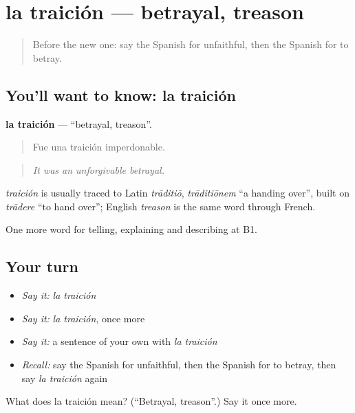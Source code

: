 \section[la traición]{la traición — betrayal, treason}

\label{lesson:ES-C745-traicion}



\begin{quote}
Before the new one: say the Spanish for unfaithful, then the Spanish for to betray.
\end{quote}

\subsection*{You'll want to know: la traición}
\textbf{la traición} — \textquotedblleft{}betrayal, treason\textquotedblright{}.

\begin{quote}
Fue una traición imperdonable.
\end{quote}

\begin{quote}
\emph{It was an unforgivable betrayal.}
\end{quote}

\begin{cousinweb}
\emph{traición} is usually traced to Latin \emph{trāditiō}, \emph{trāditiōnem} \textquotedblleft{}a handing over\textquotedblright{}, built on \emph{trādere} \textquotedblleft{}to hand over\textquotedblright{}; English \emph{treason} is the same word through French.
\end{cousinweb}

\begin{grammarlens}[title={What you've built}]
One more word for telling, explaining and describing at B1.
\end{grammarlens}

\subsection*{Your turn}
\begin{itemize}
\raggedright
  \item \emph{Say it:} \emph{la traición}
  \item \emph{Say it:} \emph{la traición}, once more
  \item \emph{Say it:} a sentence of your own with \emph{la traición}
  \item \emph{Recall:} say the Spanish for unfaithful, then the Spanish for to betray, then say \emph{la traición} again
\end{itemize}

\begin{tcolorbox}[breakable,colback=teal!4,colframe=teal!35!black,title={Before you move on}]
What does la traición mean? (\textquotedblleft{}Betrayal, treason\textquotedblright{}.) Say it once more.
\end{tcolorbox}

